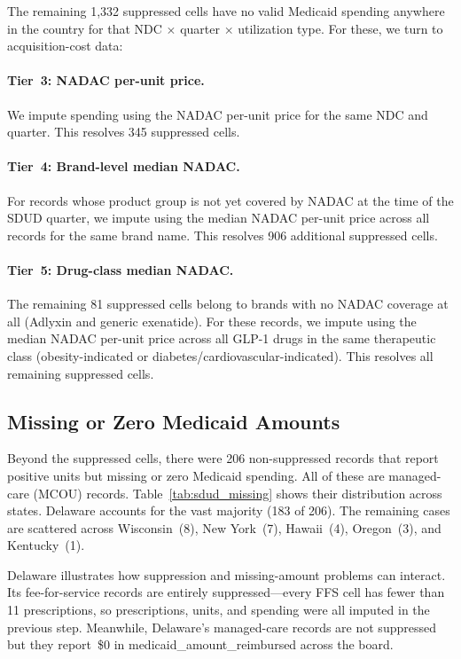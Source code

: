 The remaining 1{,}332 suppressed cells have no valid Medicaid spending anywhere in the country for that NDC $\times$ quarter $\times$ utilization type. For these, we turn to acquisition-cost data:

\paragraph{Tier~3: NADAC per-unit price.} We impute spending using the NADAC per-unit price for the same NDC and quarter. This resolves 345 suppressed cells.

\paragraph{Tier~4: Brand-level median NADAC.} For records whose product group is not yet covered by NADAC at the time of the SDUD quarter, we impute using the median NADAC per-unit price across all records for the same brand name. This resolves 906 additional suppressed cells.

\paragraph{Tier~5: Drug-class median NADAC.} The remaining 81 suppressed cells belong to brands with no NADAC coverage at all (Adlyxin and generic exenatide). For these records, we impute using the median NADAC per-unit price across all GLP-1 drugs in the same therapeutic class (obesity-indicated or diabetes/cardiovascular-indicated). This resolves all remaining suppressed cells.

\subsection{Missing or Zero Medicaid Amounts}

Beyond the suppressed cells, there were 206 non-suppressed records that report positive units but missing or zero Medicaid spending. All of these are managed-care (MCOU) records. Table~\ref{tab:sdud_missing} shows their distribution across states. Delaware accounts for the vast majority (183 of 206). The remaining cases are scattered across Wisconsin~(8), New York~(7), Hawaii~(4), Oregon~(3), and Kentucky~(1).

Delaware illustrates how suppression and missing-amount problems can interact. Its fee-for-service records are entirely suppressed---every FFS cell has fewer than 11 prescriptions, so prescriptions, units, and spending were all imputed in the previous step. Meanwhile, Delaware's managed-care records are not suppressed but they report~\$0 in medicaid\_amount\_reimbursed across the board.

